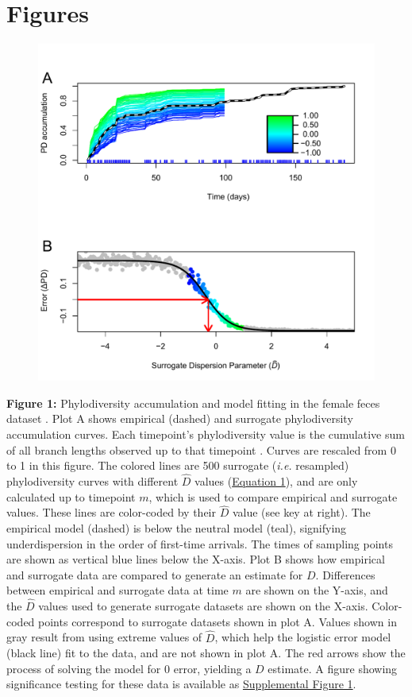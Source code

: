 \documentclass{article}
\begin{document}
\section{Figures}
{\parindent0pt %
\begin{figure}[ht]
	\centering
	\includegraphics[scale=0.80]{figs/Fig_1.pdf}
\end{figure}
\textbf{Figure 1:}\label{sec:figure1} Phylodiversity accumulation and model fitting in the female feces dataset \cite{Caporaso2011}. Plot A shows empirical (dashed) and surrogate phylodiversity accumulation curves. Each timepoint's phylodiversity value is the cumulative sum of all branch lengths observed up to that timepoint \cite{Faith1992}. Curves are rescaled from 0 to 1 in this figure. The colored lines are 500 surrogate (\emph{i.e.} resampled) phylodiversity curves with different \(\hat{D}\) values (\hyperref[sec:equation1]{Equation 1}), and are only calculated up to timepoint \(m\), which is used to compare empirical and surrogate values. These lines are color-coded by their \(\hat{D}\) value (see key at right). The empirical model (dashed) is below the neutral model (teal), signifying underdispersion in the order of first-time arrivals. The times of sampling points are shown as vertical blue lines below the X-axis. Plot B shows how empirical and surrogate data are compared to generate an estimate for \(D\). Differences between empirical and surrogate data at time \(m\) are shown on the Y-axis, and the \(\hat{D}\) values used to generate surrogate datasets are shown on the X-axis. Color-coded points correspond to surrogate datasets shown in plot A. Values shown in gray result from using extreme values of \(\hat{D}\), which help the logistic error model (black line) fit to the data, and are not shown in plot A. The red arrows show the process of solving the model for 0 error, yielding a \(D\) estimate. A figure showing significance testing for these data is available as \hyperref[sec:figureS1]{Supplemental Figure 1}.
\newpage

}
\end{document}

